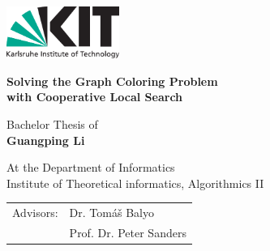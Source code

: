 \documentclass[12pt,a4paper,twoside]{scrartcl}
\numberwithin{equation}{section}
\begin{document}
\pagestyle{empty} %

\begin{titlepage}

  \begin{center}\large

    {\flushleft\includegraphics[height=17mm]{kit_logo_en.pdf} \hfill}

    \vfill

    \vspace*{2cm}

    {\bf\huge Solving the Graph Coloring Problem  \\ with Cooperative Local Search \par} %
  

    \vfill
Bachelor Thesis of \\

    \vspace*{15mm}
    {\bf Guangping Li} %

    \vspace*{15mm}

    At the Department of Informatics\\
Institute of Theoretical informatics, Algorithmics II %

    \vspace*{45mm}

    \begin{tabular}{rl}
      Advisors: & Dr. Tom{\' a}{\v s} Balyo \\ %
      & Prof. Dr. Peter Sanders  \\
    \end{tabular}
    
    \vspace*{10mm}



    \vspace*{12mm}
  \end{center}
\afterpage{\null\newpage}
\end{titlepage}
\afterpage{\null\newpage}
\vspace*{0pt}\vfill
\end{document}

